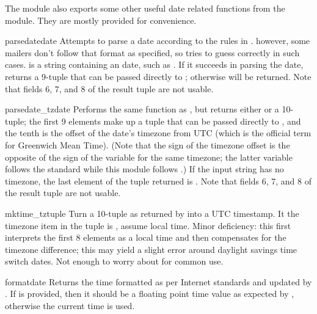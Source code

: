 \documentclass{howto}
\begin{document}
The  module also exports some other useful date
related functions from the  module.  They are mostly
provided for convenience.

\begin{funcdesc}{parsedate}{date}
Attempts to parse a date according to the rules in .
however, some mailers don't follow that format as specified, so
 tries to guess correctly in such cases. 
 is a string containing an  date, such as 
.  If it succeeds in parsing
the date,  returns a 9-tuple that can be passed
directly to ; otherwise  will be
returned.  Note that fields 6, 7, and 8 of the result tuple are not
usable.
\end{funcdesc}

\begin{funcdesc}{parsedate_tz}{date}
Performs the same function as , but returns
either  or a 10-tuple; the first 9 elements make up a tuple
that can be passed directly to , and the tenth
is the offset of the date's timezone from UTC (which is the official
term for Greenwich Mean Time).  (Note that the sign of the timezone
offset is the opposite of the sign of the 
variable for the same timezone; the latter variable follows the
\POSIX{} standard while this module follows .)  If the input
string has no timezone, the last element of the tuple returned is
.  Note that fields 6, 7, and 8 of the result tuple are not
usable.
\end{funcdesc}

\begin{funcdesc}{mktime_tz}{tuple}
Turn a 10-tuple as returned by  into a UTC
timestamp.  It the timezone item in the tuple is , assume
local time.  Minor deficiency: this first interprets the first 8
elements as a local time and then compensates for the timezone
difference; this may yield a slight error around daylight savings time
switch dates.  Not enough to worry about for common use.
\end{funcdesc}

\begin{funcdesc}{formatdate}{}
Returns the time formatted as per Internet standards 
and updated by .  If  is provided, then it
should be a floating point time value as expected by
, otherwise the current time is used.
\end{funcdesc}
\end{document}
